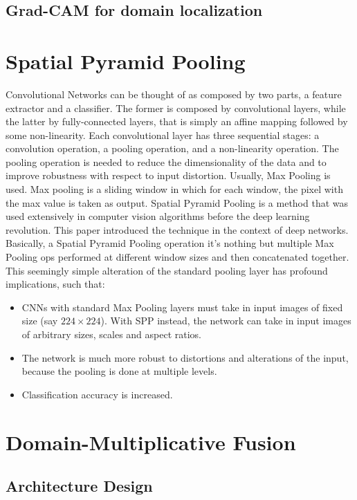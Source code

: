\documentclass[../main.tex]{subfiles}
\begin{document}
    \subsection{Grad-CAM for domain localization}

    \section{Spatial Pyramid Pooling}
    Convolutional Networks can be thought of as composed by two parts, a feature extractor and a classifier. The former is composed
    by convolutional layers, while the latter by fully-connected layers, that is simply an affine mapping followed by some non-linearity.
    Each convolutional layer has three sequential stages: a convolution operation, a pooling operation, and a non-linearity operation.
    The pooling operation is needed to reduce the dimensionality of the data and to improve robustness with respect to input distortion.
    Usually, Max Pooling is used. Max pooling is a sliding window in which for each window, the pixel with the max value is taken as output.
    Spatial Pyramid Pooling is a method that was used extensively in computer vision algorithms before the deep learning revolution.
    This paper \cite{sppooling} introduced the technique in the context of deep networks. Basically, a Spatial Pyramid Pooling operation
    it's nothing but multiple Max Pooling ops performed at different window sizes and then concatenated together. This seemingly simple
    alteration of the standard pooling layer has profound implications, such that:
    \begin{itemize}
        \item CNNs with standard Max Pooling layers must take in input images of fixed size (say $224 \times 224$). With SPP instead, the network can take in input images of arbitrary sizes, scales and aspect ratios.
        \item The network is much more robust to distortions and alterations of the input, because the pooling is done at multiple levels.
        \item Classification accuracy is increased.
    \end{itemize}


    \section{Domain-Multiplicative Fusion}
    \subsection{Architecture Design}
\end{document}
